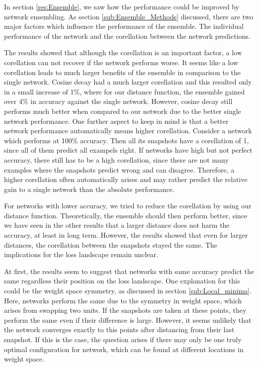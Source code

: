 In section \ref{res:Ensemble}, we saw how the performance could be improved by
network ensembling. As section \ref{sub:Ensemble_Methods} discussed, there are
two major factors which influence the performance of the ensemble. The
individual performance of the network and the corellation between the network
predictions.

The results showed that although the corellation is an important factor, a low
corellation can not recover if the network performs worse. It seems like a low
corellation leads to much larger benefits of the ensemble in comparison to the
single network. Cosine decay had a much larger corellation and this resulted
only in a small increase of 1\%, where for our distance function, the
ensemble gained over 4\% in accuracy against the single network. However, cosine
decay still performs much better when compared to our network due to the better
single network performance. One further aspect to keep in mind is that a better
network performance automatically means higher corellation. Consider a network
which performs at 100\% accuracy. Then all its snapshots have a corellation of
1, since all of them predict all exampels right. If networks have high but not
perfect accuracy, there still has to be a high corellation, since there are not
many examples where the snapshots predict wrong and can disagree. Therefore, a
higher corellation often automatically arises and may rather predict the
relative gain to a single network than the absolute performance.

For networks with lower accuracy, we tried to reduce the corellation by using
our distance function. Theoretically, the ensemble should then perform better,
since we have seen in the other results that a larger distance does not harm the
accuracy, at least in long term. However, the results showed that even for
larger distances, the corellation between the snapshots stayed the same. The
implications for the loss landscape remain unclear.

At first, the results seem to suggest that networks with same accuracy predict
the same regardless their position on the loss landscape. One explanation for
this could be the weight space symmetry, as discussed in section
\ref{sub:Local_minima}. Here, networks perform the same due to the symmetry in
weight space, which arises from swapping two units. If the snapshots are taken
at these points, they perform the same even if their difference is large.
However, it seems unlikely that the network converges exactly to this points
after distancing from their last snapshot. If this is the case, the question
arises if there may only be one truly optimal configuration for network, which
can be found at different locations in weight space.

